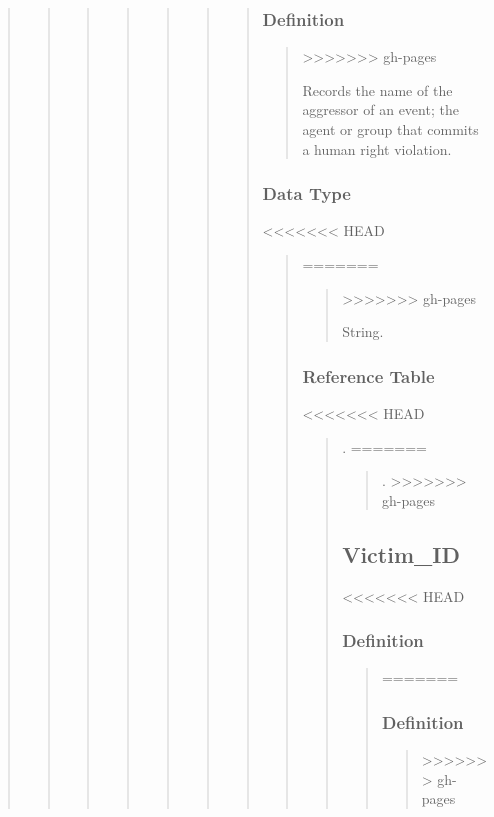 \documentclass[letterpaper,10pt,english]{sphinxmanual}
\begin{document}
\begin{quote}
\begin{quote}
\begin{quote}
\begin{quote}
\begin{quote}
\begin{quote}
\begin{quote}
\subsubsection{Definition}
\label{\detokenize{schema_tables:id5}}\begin{quote}
>>>>>>> gh-pages

\sphinxAtStartPar
Records the name of the aggressor of an event; the agent or group that commits a human right violation.
\end{quote}


\subsubsection{Data Type}
<<<<<<< HEAD
\label{\detokenize{database_schema:id6}}\begin{quote}
=======
\label{\detokenize{schema_tables:id6}}\begin{quote}
>>>>>>> gh-pages

\sphinxAtStartPar
String.
\end{quote}


\subsubsection{Reference Table}
<<<<<<< HEAD
\label{\detokenize{database_schema:id7}}\begin{quote}

\sphinxAtStartPar
{\hyperref[\detokenize{database_schema:aggressor-table}]{}}.
=======
\label{\detokenize{schema_tables:id7}}\begin{quote}

\sphinxAtStartPar
{\hyperref[\detokenize{schema_tables:aggressor-table}]{}}.
>>>>>>> gh-pages
\end{quote}


\subsection{Victim\_ID}
<<<<<<< HEAD
\label{\detokenize{database_schema:victim-id}}

\subsubsection{Definition}
\label{\detokenize{database_schema:id8}}\begin{quote}
=======
\label{\detokenize{schema_tables:victim-id}}

\subsubsection{Definition}
\label{\detokenize{schema_tables:id8}}\begin{quote}
>>>>>>> gh-pages


\end{quote}
\end{quote}
\end{quote}
\end{quote}
\end{quote}
\end{quote}
\end{quote}
\end{quote}
\end{quote}
\end{quote}
\end{quote}
\end{document}
